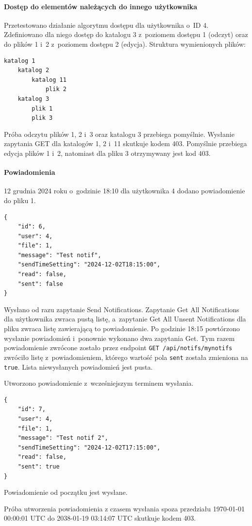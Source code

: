 \documentclass[a4paper,twoside,12pt]{book}
\begin{document}
\paragraph{Dostęp do elementów należących do innego użytkownika}
Przetestowano działanie algorytmu dostępu dla użytkownika o~ID 4. Zdefiniowano dla niego dostęp do katalogu 3 z~poziomem dostępu 1 (odczyt) oraz do plików 1 i~2 z~poziomem dostępu 2 (edycja). Struktura wymienionych plików:
\begin{verbatim}
katalog 1
	katalog 2
		katalog 11
			plik 2
	katalog 3
		plik 1
		plik 3
\end{verbatim}
Próba odczytu plików 1, 2 i~3 oraz katalogu 3 przebiega pomyślnie. Wysłanie zapytania GET dla katalogów 1, 2 i~11 skutkuje kodem 403. Pomyślnie przebiega edycja plików 1 i~2, natomiast dla pliku 3 otrzymywany jest kod 403.

\paragraph{Powiadomienia}
12 grudnia 2024 roku o~godzinie 18:10 dla użytkownika 4 dodano powiadomienie do pliku 1. 
\begin{verbatim}
{
	"id": 6,
	"user": 4,
	"file": 1,
	"message": "Test notif",
	"sendTimeSetting": "2024-12-02T18:15:00",
	"read": false,
	"sent": false
}
\end{verbatim}
Wysłano od razu zapytanie Send Notifications. Zapytanie Get All Notifications dla użytkownika zwraca pustą listę, a~zapytanie Get All Unsent Notifications dla pliku zwraca listę zawierającą to powiadomienie. Po godzinie 18:15 powtórzono wysłanie powiadomień i~ponownie wykonano dwa zapytania Get. Tym razem powiadomienie zwrócone zostało przez endpoint \texttt{GET /api/notifs/mynotifs} zwróciło listę z~powiadomieniem, którego wartość pola \texttt{sent} została zmieniona na \texttt{true}. Lista niewysłanych powiadomień jest pusta.

Utworzono powiadomienie z~wcześniejszym terminem wysłania.
\begin{verbatim}
{
	"id": 7,
	"user": 4,
	"file": 1,
	"message": "Test notif 2",
	"sendTimeSetting": "2024-12-02T17:15:00",
	"read": false,
	"sent": true
}
\end{verbatim}
Powiadomienie od początku jest wysłane.

Próba utworzenia powiadomienia z czasem wysłania spoza przedziału 1970-01-01 00:00:01 UTC do 2038-01-19 03:14:07 UTC skutkuje kodem 403.
\end{document}
